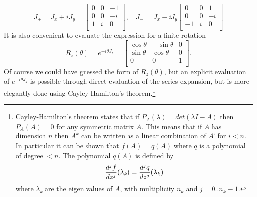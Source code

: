 \begin{equation}
J_+=J_x+iJ_y=\left[\begin{array}{rrr}
          0 & 0 &-1  \\
          0 & 0 &-i  \\
          1 & i & 0  \\
          \end{array}\right],\quad
J_-=J_x-iJ_y\left[\begin{array}{rrr}
          0 & 0 & 1  \\
          0 & 0 &-i  \\
          -1& i & 0  \\
          \end{array}\right]
\end{equation}
It is also convenient to evaluate the expression for a finite rotation
\begin{equation}
R_z(\theta)=e^{-i\theta J_z}=\left[\begin{array}{ccc}
	\cos\theta & -\sin\theta & 0 \\
	\sin\theta &  \cos\theta & 0 \\
	 0         &  0          & 1 \\
	\end{array}\right].
\end{equation}
Of course we could have guessed the form of $R_z(\theta)$, but an
explicit evaluation of $e^{-i\theta J_z}$ is possible through
direct evaluation of the series expansion, but is more elegantly 
done using Cayley-Hamilton's theorem.\footnote{Cayley-Hamilton's 
theorem states that if $P_A(\lambda)=det(\lambda I-A)$ then $P_A(A)=0$
for any symmetric matrix $A$. This means that if $A$ has dimension
$n$ then $A^k$ can be written as a linear combination of $A^i$ for
$i<n$. In particular it can be shown that $f(A)=q(A)$ where $q$
is a polynomial of degree $<n$. The polynomial $q(A)$ is defined
by  
\begin{equation}
{d^jf\over dz^j}(\lambda_k)={d^jq\over dz^j}(\lambda_k)
\end{equation}
where $\lambda_k$ are the eigen values of $A$, with multiplicity
$n_k$ and $j=0..n_k-1$.
}

